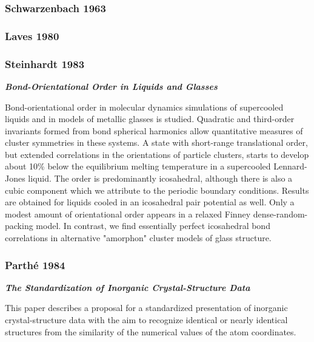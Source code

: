 \documentclass[11pt]{article}
\begin{document}
    \subsubsection{Schwarzenbach 1963}\label{schwarzenbach-1963}

    \subsubsection{Laves 1980}\label{laves-1980}

    \subsubsection{Steinhardt 1983}\label{steinhardt-1983}

\textbf{\emph{Bond-Orientational Order in Liquids and Glasses}}

Bond-orientational order in molecular dynamics simulations of
supercooled liquids and in models of metallic glasses is studied.
Quadratic and third-order invariants formed from bond spherical
harmonics allow quantitative measures of cluster symmetries in these
systems. A state with short-range translational order, but extended
correlations in the orientations of particle clusters, starts to develop
about 10\% below the equilibrium melting temperature in a supercooled
Lennard-Jones liquid. The order is predominantly icosahedral, although
there is also a cubic component which we attribute to the periodic
boundary conditions. Results are obtained for liquids cooled in an
icosahedral pair potential as well. Only a modest amount of
orientational order appears in a relaxed Finney dense-random-packing
model. In contrast, we find essentially perfect icosahedral bond
correlations in alternative "amorphon" cluster models of glass
structure.

    \subsubsection{Parthé 1984}\label{parthuxe9-1984}

\textbf{\emph{The Standardization of Inorganic Crystal-Structure Data}}

This paper describes a proposal for a standardized presentation of
inorganic crystal-structure data with the aim to recognize identical or
nearly identical structures from the similarity of the numerical values
of the atom coordinates.
\end{document}
